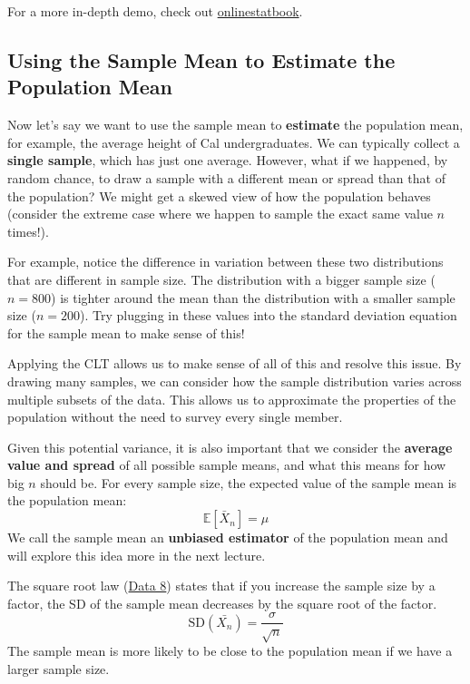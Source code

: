 \documentclass[
  letterpaper,
  DIV=11,
  numbers=noendperiod]{scrreprt}
\begin{document}
For a more in-depth demo, check out
\href{https://onlinestatbook.com/stat_sim/sampling_dist/}{onlinestatbook}.

\subsection{Using the Sample Mean to Estimate the Population
Mean}\label{using-the-sample-mean-to-estimate-the-population-mean}

Now let's say we want to use the sample mean to \textbf{estimate} the
population mean, for example, the average height of Cal undergraduates.
We can typically collect a \textbf{single sample}, which has just one
average. However, what if we happened, by random chance, to draw a
sample with a different mean or spread than that of the population? We
might get a skewed view of how the population behaves (consider the
extreme case where we happen to sample the exact same value \(n\)
times!).

For example, notice the difference in variation between these two
distributions that are different in sample size. The distribution with a
bigger sample size (\(n=800\)) is tighter around the mean than the
distribution with a smaller sample size (\(n=200\)). Try plugging in
these values into the standard deviation equation for the sample mean to
make sense of this!

Applying the CLT allows us to make sense of all of this and resolve this
issue. By drawing many samples, we can consider how the sample
distribution varies across multiple subsets of the data. This allows us
to approximate the properties of the population without the need to
survey every single member.

Given this potential variance, it is also important that we consider the
\textbf{average value and spread} of all possible sample means, and what
this means for how big \(n\) should be. For every sample size, the
expected value of the sample mean is the population mean:
\[\mathbb{E}[\bar{X}_n] = \mu\] We call the sample mean an
\textbf{unbiased estimator} of the population mean and will explore this
idea more in the next lecture.

\begin{tcolorbox}[enhanced jigsaw, colback=white, arc=.35mm, toprule=.15mm, colframe=quarto-callout-tip-color-frame, coltitle=black, opacitybacktitle=0.6, breakable, titlerule=0mm, leftrule=.75mm, left=2mm, opacityback=0, bottomtitle=1mm, rightrule=.15mm, colbacktitle=quarto-callout-tip-color!10!white, bottomrule=.15mm, title=\textcolor{quarto-callout-tip-color}{\faLightbulb}\hspace{0.5em}{Data 8 Recap: Square Root Law}, toptitle=1mm]

The square root law
(\href{https://inferentialthinking.com/chapters/14/5/Variability_of_the_Sample_Mean.html\#the-square-root-law}{Data
8}) states that if you increase the sample size by a factor, the SD of
the sample mean decreases by the square root of the factor.
\[\text{SD}(\bar{X_n}) = \frac{\sigma}{\sqrt{n}}\] The sample mean is
more likely to be close to the population mean if we have a larger
sample size.

\end{tcolorbox}
\end{document}
